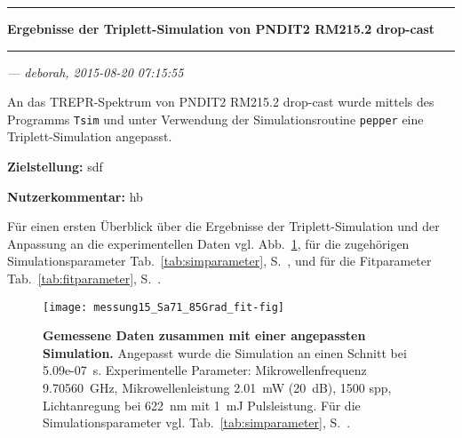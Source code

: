 \documentclass{article}
\begin{document}
\thispagestyle{empty}

\vspace*{-1.5cm}

\noindent\rule[1.5ex]{\textwidth}{1pt}

\begin{sffamily}\bfseries\large
Ergebnisse der Triplett-Simulation von PNDIT2 RM215.2 drop-cast
\end{sffamily}

\noindent\rule{\textwidth}{1pt}

\begin{flushright}\slshape
--- deborah, 2015-08-20 07:15:55
\end{flushright}

\vspace*{1.5em}

An das TREPR-Spektrum von PNDIT2 RM215.2 drop-cast wurde mittels des Programms \texttt{Tsim} und unter Verwendung der Simulationsroutine \texttt{pepper} eine Triplett-Simulation angepasst.


\textbf{Zielstellung:} sdf

\textbf{Nutzerkommentar:} hb


Für einen ersten Überblick über die Ergebnisse der Triplett-Simulation und der Anpassung an die experimentellen Daten vgl. Abb.~\ref{fig:ergebnisse}, für die zugehörigen Simulationsparameter Tab.~\ref{tab:simparameter}, S.~\pageref{tab:simparameter}, und für die Fitparameter Tab.~\ref{tab:fitparameter}, S.~\pageref{tab:fitparameter}.


\begin{figure}[h]
\centering

\texttt{[image: messung15\_Sa71\_85Grad\_fit-fig]}

\caption{\textbf{Gemessene Daten zusammen mit einer angepassten Simulation.} Angepasst wurde die Simulation an einen Schnitt bei 5.09e-07~s. Experimentelle Parameter: Mikrowellenfrequenz  9.70560~GHz, Mikrowellenleistung  2.01~mW (20~dB), 1500 spp, Lichtanregung bei 622~nm mit   1~mJ Pulsleistung. Für die Simulationsparameter vgl. Tab.~\ref{tab:simparameter}, S.~\pageref{tab:simparameter}.}
\label{fig:ergebnisse}
\end{figure}

\begin{center}
\setlength{\fboxsep}{1.5ex}\setlength{\fboxrule}{.75pt}
\end{center}
\end{document}
